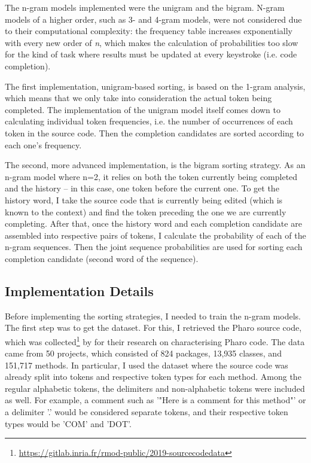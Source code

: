 \documentclass[sigplan,screen]{acmart}
\begin{document}
The n-gram models implemented were the unigram and the bigram. N-gram models of a higher order, such as 3- and 4-gram models, were not considered due to their computational complexity: the frequency table increases exponentially with every new order of \textit{n}, which makes the calculation of probabilities too slow for the kind of task where results must be updated at every keystroke (i.e. code completion).

The first implementation, unigram-based sorting, is based on the 1-gram analysis, which means that we only take into consideration the actual token being completed. The implementation of the unigram model itself comes down to calculating individual token frequencies, i.e. the number of occurrences of each token in the source code. Then the completion candidates are sorted according to each one's frequency.

The second, more advanced implementation, is the bigram sorting strategy. As an n-gram model where n=2, it relies on both the token currently being completed and the history -- in this case, one token before the current one. To get the history word, I take the source code that is currently being edited (which is known to the context) and find the token preceding the one we are currently completing. After that, once the history word and each completion candidate are assembled into respective pairs of tokens, I calculate the probability of each of the n-gram sequences. Then the joint sequence probabilities are used for sorting each completion candidate (second word of the sequence).

\subsection{Implementation Details}
Before implementing the sorting strategies, I needed to train the n-gram models. The first step was to get the dataset. For this, I retrieved the Pharo source code, which was collected\footnote{\url{https://gitlab.inria.fr/rmod-public/2019-sourcecodedata}} by \cite{Zait20a} for their research on characterising Pharo code. The data came from 50 projects, which consisted of 824 packages, 13,935 classes, and 151,717 methods. In particular, I used the dataset where the source code was already split into tokens and respective token types for each method. Among the regular alphabetic tokens, the delimiters and non-alphabetic tokens were included as well. For example, a comment such as '"Here is a comment for this method"' or a delimiter '.' would be considered separate tokens, and their respective token types would be 'COM' and 'DOT'.
\end{document}

